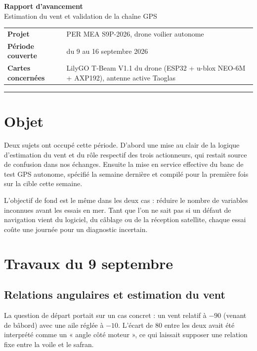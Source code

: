 \documentclass[11pt,a4paper]{article}
\begin{document}
\begin{center}
{\LARGE\bfseries Rapport d'avancement}\\[0.4em]
{\large Estimation du vent et validation de la chaîne GPS}
\end{center}

\vspace{0.8em}

\begin{tabularx}{\textwidth}{@{}l X@{}}
\textbf{Projet} & PER MEA S9P-2026, drone voilier autonome \\
\textbf{Période couverte} & du 9 au 16 septembre 2026 \\
\textbf{Cartes concernées} & LilyGO T-Beam V1.1 du drone (ESP32 + u-blox NEO-6M + AXP192),
antenne active Taoglas \\
\end{tabularx}

\vspace{0.5em}
\hrule
\vspace{0.5em}

\section{Objet}

Deux sujets ont occupé cette période. D'abord une mise au clair de la logique
d'estimation du vent et du rôle respectif des trois actionneurs, qui restait
source de confusion dans nos échanges. Ensuite la mise en service effective du
banc de test GPS autonome, spécifié la semaine dernière et compilé pour la
première fois sur la cible cette semaine.

L'objectif de fond est le même dans les deux cas : réduire le nombre de
variables inconnues avant les essais en mer. Tant que l'on ne sait pas si un
défaut de navigation vient du logiciel, du câblage ou de la réception
satellite, chaque essai coûte une journée pour un diagnostic incertain.

\section{Travaux du 9 septembre}

\subsection{Relations angulaires et estimation du vent}

La question de départ portait sur un cas concret : un vent relatif à $-90$\textdegree{}
(venant de bâbord) avec une aile réglée à $-10$\textdegree{}. L'écart de $80$\textdegree{} entre les deux
avait été interprété comme un « angle côté moteur », ce qui laissait supposer
une relation fixe entre la voile et le safran.
\end{document}
